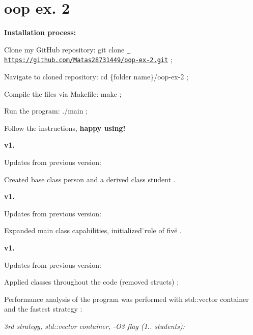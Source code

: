 \chapter{oop ex. 2}
\hypertarget{md__r_e_a_d_m_e}{}\label{md__r_e_a_d_m_e}
\label{md__r_e_a_d_m_e_autotoc_md0}%
%
 {\bfseries{Installation process\+:}}

Clone my Git\+Hub repository\+: {\ttfamily git clone \href{https://github.com/Matas28731449/oop-ex-2.git}{\texttt{ https\+://github.\+com/\+Matas28731449/oop-\/ex-\/2.\+git}}} ;

Navigate to cloned repository\+: {\ttfamily cd \{folder name\}/oop-\/ex-\/2} ;

Compile the files via Makefile\+: {\ttfamily make} ;

Run the program\+: {\ttfamily ./main} ;

Follow the instructions, {\bfseries{happy using!}}

{\bfseries{v1.}}

Updates from previous version\+:


\begin{DoxyItemize}
\item Created base class {\ttfamily person} and a derived class {\ttfamily student} .
\end{DoxyItemize}

{\bfseries{v1.}}

Updates from previous version\+:


\begin{DoxyItemize}
\item Expanded main class capabilities, initialized {\ttfamily \"{}rule of five\"{}} .
\end{DoxyItemize}

{\bfseries{v1.}}

Updates from previous version\+:


\begin{DoxyItemize}
\item {\ttfamily Applied classes} throughout the code (removed structs) ;
\item {\ttfamily Performance analysis} of the program was {\ttfamily performed} with {\ttfamily std\+::vector} container and the {\ttfamily fastest strategy} \+:
\end{DoxyItemize}

{\itshape 3rd strategy, std\+::vector container, -\/O3 flag (1.. students)\+:}

